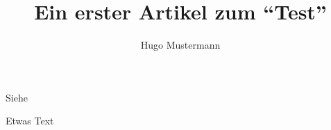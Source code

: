 \documentclass{dtk2}
\author{Hugo Mustermann}
\begin{document}
\title{Ein erster Artikel zum "`Test"'}

\maketitle
\nocite{*}
Siehe~\cite{knuth:ct:a}

Etwas Text \clearpage

\printbibliography
\end{document}

